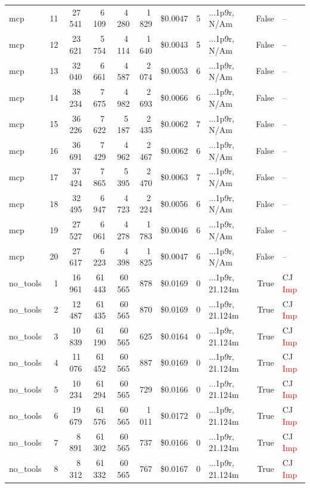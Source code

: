 \documentclass[a4paper,11pt]{article}
\begin{document}
\begin{table}[H]
{\begin{tabular}{l r r r r r r r l r l}
mcp & 11 & 27\,541 & 6\,109 & 4\,280 & 1\,829 & \$0.0047 & 5 & ...1p9r, N/Am & False & -- \\
mcp & 12 & 23\,621 & 5\,754 & 4\,114 & 1\,640 & \$0.0043 & 5 & ...1p9r, N/Am & False & -- \\
mcp & 13 & 32\,040 & 6\,661 & 4\,587 & 2\,074 & \$0.0053 & 6 & ...1p9r, N/Am & False & -- \\
mcp & 14 & 38\,234 & 7\,675 & 4\,982 & 2\,693 & \$0.0066 & 6 & ...1p9r, N/Am & False & -- \\
mcp & 15 & 36\,226 & 7\,622 & 5\,187 & 2\,435 & \$0.0062 & 7 & ...1p9r, N/Am & False & -- \\
mcp & 16 & 36\,691 & 7\,429 & 4\,962 & 2\,467 & \$0.0062 & 6 & ...1p9r, N/Am & False & -- \\
mcp & 17 & 37\,424 & 7\,865 & 5\,395 & 2\,470 & \$0.0063 & 7 & ...1p9r, N/Am & False & -- \\
mcp & 18 & 32\,495 & 6\,947 & 4\,723 & 2\,224 & \$0.0056 & 6 & ...1p9r, N/Am & False & -- \\
mcp & 19 & 27\,527 & 6\,061 & 4\,278 & 1\,783 & \$0.0046 & 6 & ...1p9r, N/Am & False & -- \\
mcp & 20 & 27\,617 & 6\,223 & 4\,398 & 1\,825 & \$0.0047 & 6 & ...1p9r, N/Am & False & -- \\
\midrule
no\_tools & 1 & 16\,961 & 61\,443 & 60\,565 & 878 & \$0.0169 & 0 & ...1p9r, 21.124m & True & CJ \textcolor{red}{Imp} \\
no\_tools & 2 & 12\,487 & 61\,435 & 60\,565 & 870 & \$0.0169 & 0 & ...1p9r, 21.124m & True & CJ \textcolor{red}{Imp} \\
no\_tools & 3 & 10\,839 & 61\,190 & 60\,565 & 625 & \$0.0164 & 0 & ...1p9r, 21.124m & True & CJ \textcolor{red}{Imp} \\
no\_tools & 4 & 11\,076 & 61\,452 & 60\,565 & 887 & \$0.0169 & 0 & ...1p9r, 21.124m & True & CJ \textcolor{red}{Imp} \\
no\_tools & 5 & 10\,234 & 61\,294 & 60\,565 & 729 & \$0.0166 & 0 & ...1p9r, 21.124m & True & CJ \textcolor{red}{Imp} \\
no\_tools & 6 & 19\,679 & 61\,576 & 60\,565 & 1\,011 & \$0.0172 & 0 & ...1p9r, 21.124m & True & CJ \textcolor{red}{Imp} \\
no\_tools & 7 & 8\,891 & 61\,302 & 60\,565 & 737 & \$0.0166 & 0 & ...1p9r, 21.124m & True & CJ \textcolor{red}{Imp} \\
no\_tools & 8 & 8\,312 & 61\,332 & 60\,565 & 767 & \$0.0167 & 0 & ...1p9r, 21.124m & True & CJ \textcolor{red}{Imp} \\

\end{tabular}}
\end{table}
\end{document}
